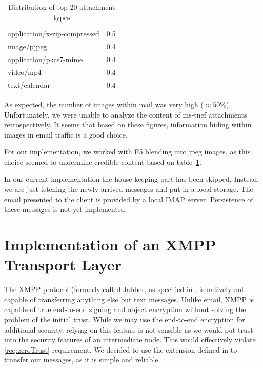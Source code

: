 \begin{table}[ht]
\begin{tabular}{l|r}
		application/x-zip-compressed                                                &    0.5\\
		image/pjpeg                                                                 &    0.4\\
		application/pkcs7-mime                                                      &    0.4\\
		video/mp4                                                                   &    0.4\\
		text/calendar                                                               &    0.4\\\hline
	\end{tabular}
	\caption{Distribution of top 20 attachment types}
	\label{tab:emailAttachments}
\end{table}

As expected, the number of images within mail was very high ($\approx 50\%$). Unfortunately, we were unable to analyze the content of ms-tnef attachments retrospectively. It seems that based on these figures, information hiding within images in email traffic is a good choice.

For our implementation, we worked with F5 blending into jpeg images, as this choice seemed to undermine credible content based on table~\ref{tab:emailAttachments}.

In our current implementation the house keeping part has been skipped. Instead, we are just fetching the newly arrived messages and put in a local storage. The email presented to the client is provided by a local IMAP server. Persistence of these messages is not yet implemented. 

\section{Implementation of an XMPP Transport Layer}
The XMPP protocol (formerly called  Jabber, as specified in \cite{rfc6120}, is natively not capable of transferring anything else but text messages. Unlike email, XMPP is capable of true end-to-end signing and object encryption without solving the problem of the initial trust. While we may use the end-to-end encryption for additional security, relying on this feature is not sensible as we would put trust into the security features of an intermediate node. This would effectively violate \ref{req:zeroTrust} requirement. We decided to use the extension defined in \cite{xep0231} to transfer our messages, as it is simple and reliable.

